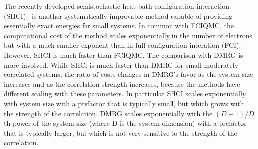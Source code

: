 \documentclass[%
preprint,
 superscriptaddress,
 amsmath,amssymb,
 aps,
]{revtex4-1}
\begin{document}
The recently developed semistochastic heat-bath configuration interaction (SHCI)~\cite{HolTubUmr-JCTC-16,ShaHolJeaAlaUmr-JCTC-17,HolUmrSha-JCP-17,SmiMusHolSha-JCTC-17,MusSha-JCTC-17,ChiHolOttUmrShaZim-JPCA-18} is another systematically improvable method capable of providing essentially exact energies for small systems.
In common with FCIQMC, the computational cost of the method scales exponentially in the number of electrons but with a
much smaller exponent than in full configuration interation (FCI).  However, SHCI is much faster than FCIQMC.
The comparison with DMRG is more involved.
While SHCI is much faster than DMRG for small moderately correlated systems, the ratio of costs changes in
DMRG's favor as the system size increases and as the correlation strength increases, because the methods
have different scaling with these parameters.
In particular SHCI scales exponentially with system size with a prefactor that is typically small, but which grows with
the strength of the correlation.
DMRG scales exponentially with the $(D-1)/D$th power of the system size (where D is the system dimension) with a prefactor that is typically larger,
but which is not very sensitive to the strength of the correlation.
\end{document}
